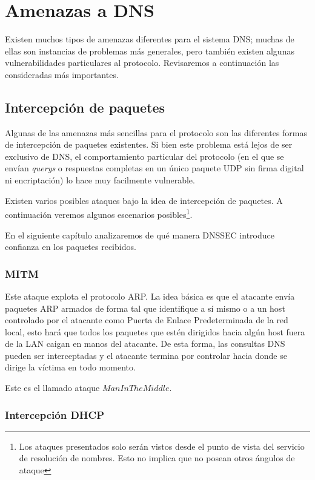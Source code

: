 \chapter{Amenazas a DNS}

Existen muchos tipos de amenazas diferentes para el sistema DNS; muchas de ellas son instancias de problemas m\'as generales, pero tambi\'en existen algunas vulnerabilidades particulares al protocolo. Revisaremos a continuaci\'on las consideradas m\'as importantes\cite{rfc3833}.

\section{Intercepci\'on de paquetes}

Algunas de las amenazas m\'as sencillas para el protocolo son las diferentes formas de intercepci\'on de paquetes existentes. Si bien este problema est\'a lejos de ser exclusivo de DNS, el comportamiento particular del protocolo (en el que se env\'ian \textit{querys} o respuestas completas en un \'unico paquete UDP sin firma digital ni encriptaci\'on) lo hace muy facilmente vulnerable. 

Existen varios posibles ataques bajo la idea de intercepci\'on de paquetes. A continuaci\'on veremos algunos escenarios posibles\footnote{Los ataques presentados solo ser\'an vistos desde el punto de vista del servicio de resoluci\'on de nombres. Esto no implica que no posean otros \'angulos de ataque}.

En el siguiente cap\'itulo analizaremos de qu\'e manera DNSSEC introduce confianza en los paquetes recibidos.

\subsection{MITM}

Este ataque explota el protocolo ARP. La idea b\'asica es que el atacante env\'ia paquetes ARP armados de forma tal que identifique a s\'i mismo o a un host controlado por el atacante como Puerta de Enlace Predeterminada de la red local, esto har\'a que todos los paquetes que est\'en dirigidos hacia alg\'un host fuera de la LAN caigan en manos del atacante. De esta forma, las consultas DNS pueden ser interceptadas y el atacante termina por controlar hacia donde se dirige la v\'ictima en todo momento.

Este es el llamado ataque $Man In The Middle$.

\subsection{Intercepci\'on DHCP}

